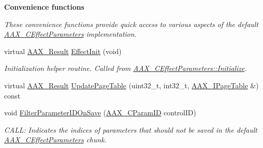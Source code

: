 \begin{Indent}{\bf Convenience functions}\par
{\em These convenience functions provide quick access to various aspects of the default \hyperlink{a00018}{A\+A\+X\+\_\+\+C\+Effect\+Parameters} implementation. }\begin{DoxyCompactItemize}
\item 
virtual \hyperlink{a00149_a4d8f69a697df7f70c3a8e9b8ee130d2f}{A\+A\+X\+\_\+\+Result} \hyperlink{a00018_a2e302fd758d39a6a855023bf825fe148}{Effect\+Init} (void)
\begin{DoxyCompactList}\small\item\em Initialization helper routine. Called from \hyperlink{a00018_ac36930c5177d982a30164c0b0477d012}{A\+A\+X\+\_\+\+C\+Effect\+Parameters\+::\+Initialize}. \end{DoxyCompactList}\item 
virtual \hyperlink{a00149_a4d8f69a697df7f70c3a8e9b8ee130d2f}{A\+A\+X\+\_\+\+Result} \hyperlink{a00018_ae407277e6f76cbc217da5811c6f216a9}{Update\+Page\+Table} (uint32\+\_\+t, int32\+\_\+t, \hyperlink{a00107}{A\+A\+X\+\_\+\+I\+Page\+Table} \&) const 
\item 
void \hyperlink{a00018_a06251bbdd6ad5d6ccee160ce4cb5ee8c}{Filter\+Parameter\+I\+D\+On\+Save} (\hyperlink{a00149_a1440c756fe5cb158b78193b2fc1780d1}{A\+A\+X\+\_\+\+C\+Param\+I\+D} control\+I\+D)
\begin{DoxyCompactList}\small\item\em C\+A\+L\+L\+: Indicates the indices of parameters that should not be saved in the default \hyperlink{a00018}{A\+A\+X\+\_\+\+C\+Effect\+Parameters} chunk. \end{DoxyCompactList}\end{DoxyCompactItemize}
\end{Indent}
